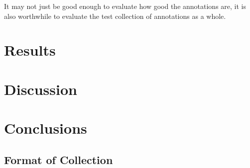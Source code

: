 \documentclass[12pt,a4paper]{article}
\begin{document}
It may not just be good enough to evaluate how good the annotations are, it is also worthwhile to evaluate the test collection of annotations as a whole.

\section{Results}

\section{Discussion}

\section{Conclusions}

\begin{appendices}
\renewcommand\thetable{\thesection\arabic{table}}
\renewcommand\thefigure{\thesection\arabic{figure}}
\section{Format of Collection} \label{app:format}

\end{appendices}



\end{document}
